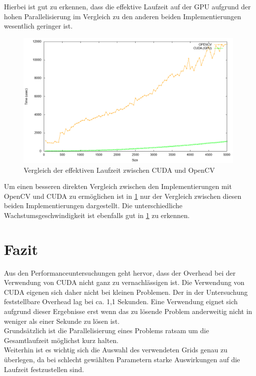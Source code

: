 \documentclass{llncs}
\begin{document}
Hierbei ist gut zu erkennen, dass die effektive Laufzeit auf der GPU aufgrund der hohen Parallelisierung im Vergleich zu den anderen beiden Implementierungen wesentlich geringer ist.

\begin{figure}
	\centering
	\includegraphics[width=\textwidth,height=\textheight,keepaspectratio]{analysis_no_plain.png}
	\caption{Vergleich der effektiven Laufzeit zwischen CUDA und OpenCV}
	\label{fig:analysis_no_plain}
\end{figure}

Um einen besseren direkten Vergleich zwischen den Implementierungen	mit OpenCV und CUDA zu ermöglichen ist in \ref{fig:analysis_no_plain} nur der Vergleich zwischen diesen beiden Implementierungen dargestellt. Die unterschiedliche Wachstumsgeschwindigkeit ist ebenfalls gut in \ref{fig:analysis_no_plain} zu erkennen.

%
\section{Fazit}
%

Aus den Performanceuntersuchungen geht hervor, dass der Overhead bei der Verwendung von CUDA nicht ganz zu vernachlässigen ist. Die Verwendung von CUDA eigenen sich daher nicht bei kleinen Problemen. Der in der Untersuchung feststellbare Overhead lag bei ca. 1,1 Sekunden. Eine Verwendung eignet sich aufgrund dieser Ergebnisse erst wenn das zu lösende Problem anderweitig nicht in weniger als einer Sekunde zu lösen ist.\\
Grundsätzlich ist die Parallelisierung eines Problems ratsam um die Gesamtlaufzeit möglichst kurz halten.\\
Weiterhin ist es wichtig sich die Auswahl des verwendeten Grids genau zu überlegen, da bei schlecht gewählten Parametern starke Auswirkungen auf die Laufzeit festzustellen sind.


%
\end{document}
